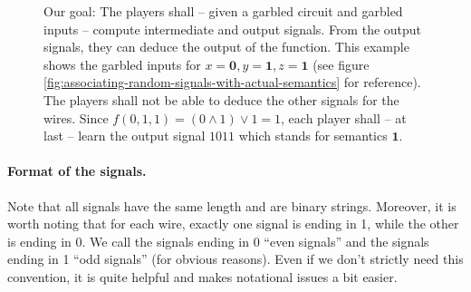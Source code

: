 \begin{figure}[t]
  \centering
  \caption{Our goal: The players shall -- given a garbled circuit and garbled inputs -- compute intermediate and output signals. From the output signals, they can deduce the output of the function. This example shows the garbled inputs for $x=\mathbf{0}, y=\mathbf{1}, z=\mathbf{1}$ (see figure \ref{fig:associating-random-signals-with-actual-semantics} for reference). The players shall not be able to deduce the other signals for the wires. Since $f(0,1,1) = (0\wedge 1) \vee 1 = 1$, each player shall -- at last -- learn the output signal $1011$ which stands for semantics $\mathbf{1}$.}
  \label{fig:sample-computation}
\end{figure}


\paragraph{Format of the signals.}

Note that all signals have the same length and are binary strings. Moreover, it is worth noting that for each wire, exactly one signal is ending in 1, while the other is ending in 0. We call the signals ending in 0 ``even signals'' and the signals ending in 1 ``odd signals'' (for obvious reasons). Even if we don't strictly need this convention, it is quite helpful and makes notational issues a bit easier.

